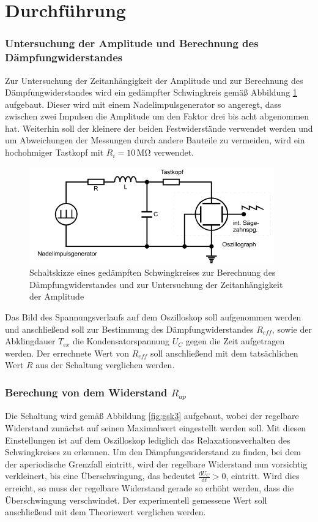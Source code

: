 \section{Durchführung}
\label{sec:Durchführung}

\subsubsection{Untersuchung der Amplitude und Berechnung des Dämpfungwiderstandes}

Zur Untersuchung der Zeitanhängigkeit der Amplitude und zur Berechnung des Dämpfungwiderstandes
wird ein gedämpfter Schwingkreis gemäß Abbildung \ref{fig:gsk2} aufgebaut. Dieser wird mit einem
Nadelimpulsgenerator so angeregt, dass zwischen zwei Impulsen die Amplitude um den Faktor drei 
bis acht abgenommen hat. Weiterhin soll der kleinere der beiden Festwiderstände verwendet werden
und um Abweichungen der Messungen durch andere Bauteile zu vermeiden, wird ein hochohmiger 
Tastkopf mit $R_i = 10\, \si{\mega\ohm}$ verwendet.

\begin{figure}[H]
  \centering
  \includegraphics{content/aufgabeA.png}
  \caption{Schaltskizze eines gedämpften Schwingkreises zur Berechnung des Dämpfungwiderstandes und zur Untersuchung der Zeitanhängigkeit der Amplitude}
  \label{fig:gsk2}
\end{figure}
\noindent
Das Bild des Spannungsverlaufs auf dem Oszilloskop soll aufgenommen werden und anschließend soll
zur Bestimmung des Dämpfungwiderstandes $R_{eff}$, sowie der Abklingdauer $T_{ex}$ die Kondensatorspannung
$U_C$ gegen die Zeit aufgetragen werden. Der errechnete Wert von $R_{eff}$ soll anschließend mit dem
tatsächlichen Wert $R$ aus der Schaltung verglichen werden.



\subsubsection{Berechung von dem Widerstand $R_{ap}$}

Die Schaltung wird gemäß Abbildung \ref{fig:gsk3} aufgebaut, wobei der regelbare Widerstand zunächst
auf seinen Maximalwert eingestellt werden soll. Mit diesen Einstellungen ist auf dem Oszilloskop
lediglich das Relaxationsverhalten des Schwingkreises zu erkennen. Um den Dämpfungswiderstand 
zu finden, bei dem der aperiodische Grenzfall eintritt, wird der regelbare Widerstand nun vorsichtig
verkleinert, bis eine Überschwingung, das bedeutet $\frac{\mathrm{d}U_C}{\mathrm{d}t} > 0$, eintritt.
Wird dies erreicht, so muss der regelbare Widerstand gerade so erhöht werden, dass die Überschwingung
verschwindet. Der experimentell gemessene Wert soll anschließend mit dem Theoriewert verglichen werden.

